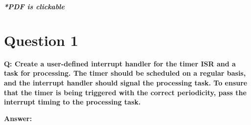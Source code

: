 \documentclass[a4paper,11pt]{article}%
\newenvironment{qanda}{\setlength{\parindent}{0pt}}{\bigskip}
\newcommand{\Q}{\bigskip\bfseries Q: }
\newcommand{\A}{\par\textbf{Answer: } \normalfont}
\begin{document}



\pagebreak

\tableofcontents
\listoffigures
\listoftables
\vfill
\begin{center}
	\textbf{\textit{*PDF is clickable}}
\end{center}

\pagebreak



\begin{qanda}

	\section{Question 1}
	\Q  Create a user-defined interrupt handler for the timer ISR and a task for processing. The timer should
	be scheduled on a regular basis, and the interrupt handler should signal the processing task. To ensure
	that the timer is being triggered with the correct periodicity, pass the interrupt timing to the processing
	task.
	\A


\end{qanda}
\end{document}
